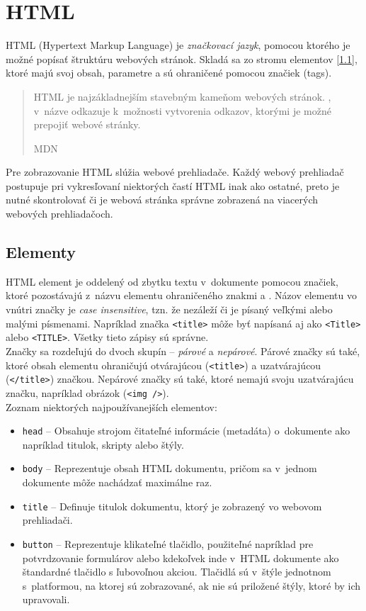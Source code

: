 \section{HTML}
\label{theory:HTML}
HTML (Hypertext Markup Language) je \emph{značkovací jazyk}, pomocou ktorého je možné popísať štruktúru webových stránok. Skladá sa zo stromu elementov [\ref{theory:HTML:elements}], ktoré majú svoj obsah, parametre a sú ohraničené pomocou značiek (tags).

\blockquote[MDN \cite{MDN}]{HTML je najzákladnejším stavebným kameňom webových stránok. , v~názve odkazuje k~možnosti vytvorenia odkazov, ktorými je možné prepojiť webové stránky.}

\noindent Pre zobrazovanie HTML slúžia webové prehliadače. Každý webový prehliadač postupuje pri vykresľovaní niektorých častí HTML inak ako ostatné, preto je nutné skontrolovať či je webová stránka správne zobrazená na viacerých webových prehliadačoch.

\subsection{Elementy}
\label{theory:HTML:elements}
HTML element je oddelený od zbytku textu v~dokumente pomocou značiek, ktoré pozostávajú z~názvu elementu ohraničeného znakmi \uv{\texttt{<}} a \uv{\texttt{>}}. Názov elementu vo vnútri značky je \emph{case insensitive}, tzn. že nezáleží či je písaný veľkými alebo malými písmenami. Napríklad značka \texttt{<title>} môže byť napísaná aj ako \texttt{<Title>} alebo \texttt{<TITLE>}. Všetky tieto zápisy sú správne. \cite{MDN} \\

\noindent Značky sa rozdeľujú do dvoch skupín -- \emph{párové} a \emph{nepárové}. Párové značky sú také, ktoré obsah elementu ohraničujú otvárajúcou (\texttt{<title>}) a uzatvárajúcou (\texttt{</title>}) značkou. Nepárové značky sú také, ktoré nemajú svoju uzatvárajúcu značku, napríklad obrázok (\texttt{<img />}). \\

\noindent Zoznam niektorých najpoužívanejších elementov:
\begin{itemize}
	\item \texttt{head} -- Obsahuje strojom čitateľné informácie (metadáta) o~dokumente ako napríklad titulok, skripty alebo štýly. \cite{MDN}
	\item \texttt{body} -- Reprezentuje obsah HTML dokumentu, pričom sa v~jednom dokumente môže nachádzať maximálne raz. \cite{MDN}
	\item \texttt{title} -- Definuje titulok dokumentu, ktorý je zobrazený vo webovom prehliadači. \cite{MDN}
	\item \texttt{button} -- Reprezentuje klikateľné tlačidlo, použiteľné napríklad pre potvrdzovanie formulárov alebo kdekoľvek inde v~HTML dokumente ako štandardné tlačidlo s ľubovoľnou akciou. Tlačidlá sú v~štýle jednotnom s~platformou, na ktorej sú zobrazované, ak nie sú priložené štýly, ktoré by ich upravovali. \cite{MDN}
\end{itemize}

